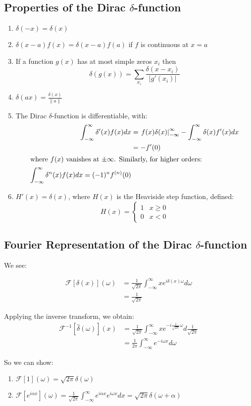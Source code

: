 \documentclass{../../physics_notes}
\newcommand{\intfty}{\int_{-\infty}^\infty}
\newcommand{\F}[2]{\mathcal{F}\left[#1\right](#2)}
\renewcommand{\Finv}[2]{\mathcal{F}^{-1}\left[#1\right](#2)}
\newcommand{\intF}[3]{\frac{1}{\sqrt{2\pi}}\intfty #1 e^{i#3#2}d#2}
\newcommand{\intFinv}[3]{\frac{1}{\sqrt{2\pi}}\intfty #1 e^{-i#3#2}d#3}
\begin{document}
\subsection{Properties of the Dirac $\delta$-function}
\begin{enumerate}
	\item{$\delta(-x) = \delta(x)$}
	\item{$\delta(x-a)f(x) = \delta(x-a)f(a)$ if $f$ is continuous at $x=a$}
	\item{If a function $g(x)$ has at most simple zeros $x_i$ then \begin{equation*}\delta(g(x)) = \sum_{x_i} \frac{\delta(x-x_i)}{\left|g'(x_i)\right|}\end{equation*}}
	\item{$\delta(ax) = \frac{\delta(x)}{\|a\|}$}
	\item{The Dirac $\delta$-function is differentiable, with: \begin{align*}\int_{-\infty}^\infty \delta '(x)f(x)dx &= \left. f(x)\delta(x)\right|_{-\infty}^\infty - \int_{-\infty}^\infty \delta(x) f'(x) dx \\ &= -f'(0) \\ \intertext{where $f(x)$ vanishes at $\pm\infty$. Similarly, for higher orders:} \intfty \delta^n (x)f(x)dx = (-1)^n f^{(n)}(0) \end{align*}}
	\item{$H'(x) = \delta(x)$, where $H(x)$ is the Heaviside step function, defined: \begin{equation} H(x) = \begin{cases} 1 & x\geq 0 \\ 0 & x < 0 \end{cases}\end{equation}}
\end{enumerate}
\subsection{Fourier Representation of the Dirac $\delta$-function}

We see:

\begin{align*}
\F{\delta(x)}{\omega} &= \intF{x}{\omega}{\delta(x)} \\
&= \frac{1}{\sqrt{2\pi}}
\end{align*}

Applying the inverse transform, we obtain:
\begin{align*}
\Finv{\hat{\delta}(\omega)}{x} &= \intFinv{x}{\omega}{\frac{1}{\sqrt{2\pi}}} \\
&= \frac{1}{2\pi}\intfty{e^{-i\omega x} d\omega}
\end{align*}

So we can show:
\begin{enumerate}
	\item{$\F{1}{\omega} = \sqrt{2\pi}\delta(\omega)$}
	\item{$\F{e^{i\alpha x}}{\omega} = \intF{e^{i\alpha x}}{x}{\omega} = \sqrt{2\pi}\delta(\omega + \alpha)$}
\end{enumerate}


\newpage
\printindex
\end{document}
